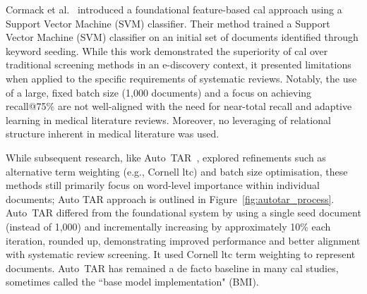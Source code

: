 \documentclass[10pt,oneside]{book}
\begin{document}
Cormack et al.~\cite{cormack_evaluation_2014} introduced a foundational feature-based \gls*{cal} approach using a Support Vector Machine (SVM) classifier. Their method trained a Support Vector Machine (SVM) classifier on an initial set of documents identified through keyword seeding. While this work demonstrated the superiority of \gls*{cal} over traditional screening methods in an e-discovery context, it presented limitations when applied to the specific requirements of systematic reviews. Notably, the use of a large, fixed batch size (1,000 documents) and a focus on achieving recall@75\% are not well-aligned with the need for near-total recall and adaptive learning in medical literature reviews. Moreover, no leveraging of relational structure inherent in medical literature was used.

While subsequent research, like Auto~TAR~\cite{cormack_autonomy_2015}, explored refinements such as alternative term weighting (e.g., Cornell ltc) and batch size optimisation, these methods still primarily focus on word-level importance within individual documents; Auto TAR approach is outlined in Figure~\ref{fig:autotar_process}. Auto~TAR differed from the foundational system by using a single seed document (instead of 1,000) and incrementally increasing by approximately 10\% each iteration, rounded up, demonstrating improved performance and better alignment with systematic review screening. It used Cornell ltc term weighting \cite{salton_smart_1965} to represent documents. Auto~TAR has remained a de facto baseline in many \gls*{cal} studies, sometimes called the ``base model implementation" (BMI).
\end{document}
